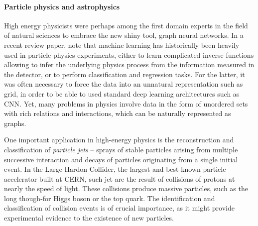 \paragraph{Particle physics and astrophysics} 
High energy physicists were perhaps among the first domain experts in the field of natural sciences to embrace the new shiny tool, graph neural networks. 
%
In a recent review paper, \cite{shlomi2020graph} note that machine learning has historically been heavily used in particle physics experiments, either to learn complicated inverse functions allowing to infer the underlying physics process from the information measured in the detector, or to perform classification and regression tasks. For the latter, it was often necessary to force the data into an unnatural representation such as grid, in order to be able to used standard deep learning architectures such as CNN. Yet, many problems in physics involve data in the form of unordered sets with rich relations and interactions, which can be naturally represented as graphs. 


One important application in high-energy physics is the reconstruction and classification of {\em particle jets} -- sprays of stable particles %
arising from multiple successive interaction and decays of particles originating from a single
initial event. %
%
In the Large Hardon Collider, the largest and best-known particle accelerator built at CERN, such jet are the result of collisions of protons at nearly the speed of light. 
These collisions produce massive particles, such as the long though-for Higgs boson or the top quark.  
%
%
The identification and classification of collision events is of crucial importance, as it might provide experimental evidence to the existence of new particles.  


